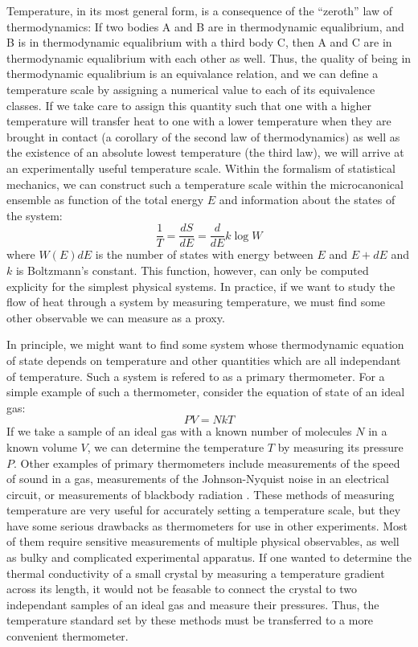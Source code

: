 \documentclass{thesis-umich}
\begin{document}
Temperature, in its most general form, is a consequence of the ``zeroth'' law
of thermodynamics: If two bodies A and B are in thermodynamic equalibrium, and
B is in thermodynamic equalibrium with a third body C, then A and C are in
thermodynamic equalibrium with each other as well. Thus, the quality of being
in thermodynamic equalibrium is an equivalance relation, and we can define a
temperature scale by assigning a numerical value to each of its equivalence
classes. If we take care to assign this quantity such that one with a higher
temperature will transfer heat to one with a lower temperature when they are
brought in contact (a corollary of the second law of thermodynamics) as well as
the existence of an absolute lowest temperature (the third law), we will arrive
at an experimentally useful temperature scale. Within the formalism of
statistical mechanics, we can construct  such a temperature scale within the
microcanonical ensemble as function of the total energy \(E\) and information
about the states of the system: \[\frac{1}{T} = \frac{dS}{dE} = \frac{d}{dE} k
\log W\] where \(W(E)dE\) is the number of states with energy between \(E\) and
\(E+dE\) and \(k\) is Boltzmann's constant. This function, however, can only be
computed explicity for the simplest physical systems. In practice, if we want
to study the flow of heat through a system by measuring temperature, we must
find some other observable we can measure as a proxy.

In principle, we might want to find some system whose thermodynamic
equation of state depends on temperature and other quantities which are
all independant of temperature. Such a system is refered to as a primary
thermometer. For a simple example of such a thermometer, consider the
equation of state of an ideal gas: \[PV = NkT\] If we take a sample of
an ideal gas with a known number of molecules \(N\) in a known volume
\(V\), we can determine the temperature \(T\) by measuring its pressure
\(P\). Other examples of primary thermometers include measurements of
the speed of sound in a gas, measurements of the Johnson-Nyquist noise
in an electrical circuit, or measurements of blackbody radiation
\cite{Ekin2006}. These methods of measuring temperature are very useful
for accurately setting a temperature scale, but they have some serious
drawbacks as thermometers for use in other experiments. Most of them
require sensitive measurements of multiple physical observables, as well
as bulky and complicated experimental apparatus. If one wanted to
determine the thermal conductivity of a small crystal by measuring a
temperature gradient across its length, it would not be feasable to
connect the crystal to two independant samples of an ideal gas and
measure their pressures. Thus, the temperature standard set by these
methods must be transferred to a more convenient thermometer.
\end{document}
